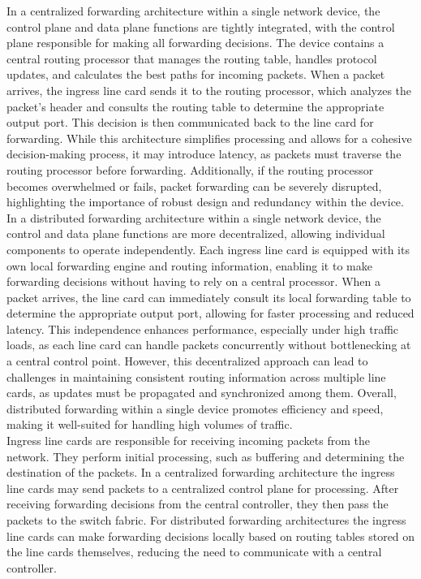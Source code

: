 \documentclass{article}
\begin{document}
	In a centralized forwarding architecture within a single network device, the control plane and data plane functions are tightly integrated, with the control plane responsible for making all forwarding decisions. The device contains a central routing processor that manages the routing table, handles protocol updates, and calculates the best paths for incoming packets. When a packet arrives, the ingress line card sends it to the routing processor, which analyzes the packet’s header and consults the routing table to determine the appropriate output port. This decision is then communicated back to the line card for forwarding. While this architecture simplifies processing and allows for a cohesive decision-making process, it may introduce latency, as packets must traverse the routing processor before forwarding. Additionally, if the routing processor becomes overwhelmed or fails, packet forwarding can be severely disrupted, highlighting the importance of robust design and redundancy within the device.\\

	In a distributed forwarding architecture within a single network device, the control and data plane functions are more decentralized, allowing individual components to operate independently. Each ingress line card is equipped with its own local forwarding engine and routing information, enabling it to make forwarding decisions without having to rely on a central processor. When a packet arrives, the line card can immediately consult its local forwarding table to determine the appropriate output port, allowing for faster processing and reduced latency. This independence enhances performance, especially under high traffic loads, as each line card can handle packets concurrently without bottlenecking at a central control point. However, this decentralized approach can lead to challenges in maintaining consistent routing information across multiple line cards, as updates must be propagated and synchronized among them. Overall, distributed forwarding within a single device promotes efficiency and speed, making it well-suited for handling high volumes of traffic.\\

	Ingress line cards are responsible for receiving incoming packets from the network. They perform initial processing, such as buffering and determining the destination of the packets. In a centralized forwarding architecture the ingress line cards may send packets to a centralized control plane for processing. After receiving forwarding decisions from the central controller, they then pass the packets to the switch fabric. For distributed forwarding architectures the ingress line cards can make forwarding decisions locally based on routing tables stored on the line cards themselves, reducing the need to communicate with a central controller.\\
\end{document}
